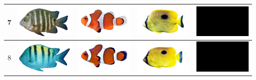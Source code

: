 \begin{longtable}{|c|c|c|c|c|}
    7 & \includegraphics[width=3cm]{gambar/abudefduf/A7} & \includegraphics[width=3cm]{gambar/amphiprion/A7} & \includegraphics[width=3cm]{gambar/chaetodon/C7} & \includegraphics[width=3cm]{gambar/negative_examples/N7} \\
    \hline
    8 & \includegraphics[width=3cm]{gambar/abudefduf/A8} & \includegraphics[width=3cm]{gambar/amphiprion/A8} & \includegraphics[width=3cm]{gambar/chaetodon/C8} & \includegraphics[width=3cm]{gambar/negative_examples/N8} \\
    \hline

\end{longtable}
